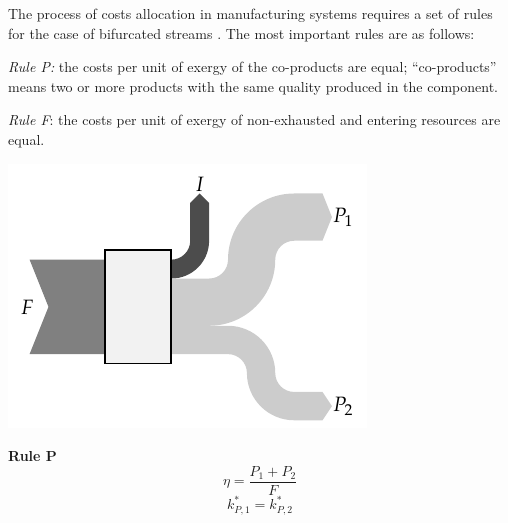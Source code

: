 \documentclass[energies,article,submit,moreauthors,pdftex]{Definitions/mdpi}
\begin{document}
The process of costs allocation in manufacturing systems requires a set of rules for the case of bifurcated streams \cite{Lozano1993,Tsatsaronis2007}. The most important rules are as follows:

\emph{Rule P:} the costs per unit of exergy of the co-products are equal; “co-products” means two or more products with the same quality produced in the component.

\emph{Rule F}: the costs per unit of exergy of non-exhausted and entering resources are equal.
\begin{center}
  \begin{minipage}[c]{0.50\linewidth}
    \includegraphics{reglaP.pdf}
  \end{minipage}
  \begin{minipage}[c]{0.45\linewidth}
    \centering
    \textbf{Rule P}
    \begin{equation*}
        \eta=\frac{P_1+P_2}{F}
    \end{equation*}
    \begin{equation*}
        k_{P,1}^*=k_{P,2}^*
    \end{equation*}
  \end{minipage}
\end{center}
\end{document}
